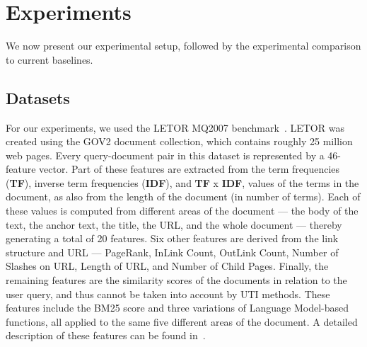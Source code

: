 \documentclass[preprint,review,10pt,3p]{elsarticle}
\begin{document}


\section{Experiments}
\label{experiments}

We now present our experimental setup, followed by the experimental comparison to current baselines.

\subsection{Datasets}
\label{sec:datasets}

For our experiments, we used the LETOR MQ2007 benchmark~\cite{liu2007letor}. LETOR  was  created using  the GOV2 document collection, which contains roughly 25 million web pages.  Every query-document pair in this dataset is represented by a 46-feature vector. Part of these features are extracted from the term frequencies (\textbf{TF}), inverse term frequencies (\textbf{IDF}), and \textbf{TF} x \textbf{IDF}, values of the terms in the document, as also from the length of the document (in number of terms). Each of these values is computed from different areas of the document --- the body of the text, the anchor text, the title, the URL, and the whole document --- thereby generating a total of 20 features. Six other features are derived from the link structure and URL --- PageRank, InLink Count, OutLink Count, Number of Slashes on URL, Length of URL, and Number of Child Pages. Finally, the remaining features are the similarity scores of the documents in relation to the user query, and thus cannot be taken into account by UTI methods. These features include the BM25 score and three variations of Language Model-based functions, all applied to the same five different areas of the document.  A detailed description of these features can be found in~\cite{liu2007letor}.
\end{document}
